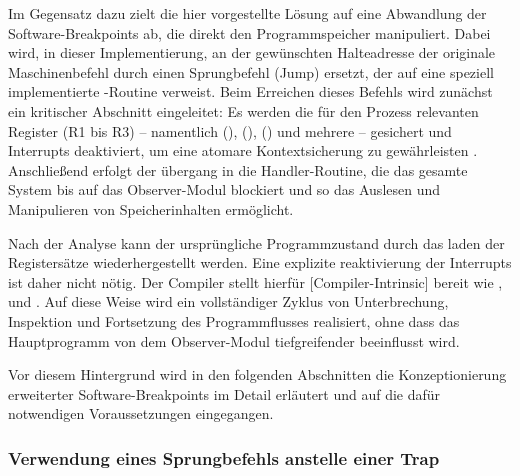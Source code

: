 Im Gegensatz dazu zielt die hier vorgestellte L\"osung auf eine Abwandlung der Software-Breakpoints ab, die direkt den Programmspeicher manipuliert. Dabei wird, in dieser Implementierung, an der gew\"unschten Halteadresse der originale Maschinenbefehl durch einen Sprungbefehl (Jump) ersetzt, der auf eine speziell implementierte -Routine verweist. Beim Erreichen dieses Befehls wird zun\"achst ein kritischer Abschnitt eingeleitet: Es werden die f\"ur den Prozess relevanten Register (R1 bis R3) – namentlich  (),  (),  () und \ggf mehrere  – gesichert und Interrupts deaktiviert, um eine atomare Kontextsicherung zu gew\"ahrleisten . Anschlie{\ss}end erfolgt der \"ubergang in die Handler-Routine, die das gesamte System bis auf das Observer-Modul blockiert und so das Auslesen und Manipulieren von Speicherinhalten erm\"oglicht.

Nach der Analyse kann der urspr\"ungliche Programmzustand durch das laden der Registers\"atze wiederhergestellt werden. Eine explizite reaktivierung der Interrupts ist daher nicht n\"otig. Der Compiler stellt hierf\"ur [Compiler-Intrinsic] bereit wie ,  und  . Auf diese Weise wird ein vollst\"andiger Zyklus von Unterbrechung, Inspektion und Fortsetzung des Programmflusses realisiert, ohne dass das Hauptprogramm von dem Observer-Modul tiefgreifender beeinflusst wird.

Vor diesem Hintergrund wird in den folgenden Abschnitten die Konzeptionierung erweiterter Software-Breakpoints im Detail erl\"autert und auf die daf\"ur notwendigen Voraussetzungen eingegangen.

\subsubsection{Verwendung eines Sprungbefehls anstelle einer Trap}
\label{sec:JumpVsTrap}

